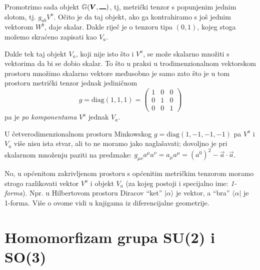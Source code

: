 Promotrimo sada objekt  $\bbtensor{G}(\vec{V},\slot)$, tj, metrički
tenzor s popunjenim jednim slotom, tj. $g_{ab}V^a$. Očito je da
taj objekt, ako ga kontrahiramo s još jednim vektorom $W^{b}$, daje skalar.
Dakle riječ je o tenzoru tipa $(0, 1)$, kojeg stoga možemo skraćeno
zapisati kao $V_a$.

Dakle tek taj objekt $V_a$, koji nije isto što i $V^a$, se može
skalarno množiti s vektorima da bi se dobio skalar. To što u praksi
u trodimenzionalnom vektorskom prostoru množimo skalarno vektore
međusobno je samo zato što je u tom prostoru metrički tenzor
jednak jediničnom 
\begin{displaymath}
g = \text{diag}(1, 1, 1) =
\begin{pmatrix}
1 & 0 & 0 \\ 0 & 1 & 0 \\ 0 & 0 & 1
\end{pmatrix}
\end{displaymath}
pa je \emph{po komponentama} $V^a$ jednak $V_a$.

U četverodimenzionalnom prostoru Minkowskog 
$g = \text{diag}(1, -1, -1, -1)$ pa $V^a$ i $V_a$ više nisu
ista stvar, ali to ne moramo jako naglašavati; dovoljno je
pri skalarnom množenju paziti na predznake:
$g_{\mu \nu} a^{\mu} a^{\nu} = a_{\mu} a^{\mu} = (a^{0})^2 
- \vec{a}\cdot\vec{a}$.

No, u općenitom zakrivljenom prostoru s općenitim metričkim
tenzorom moramo strogo razlikovati vektor $V^a$ i objekt
$V_a$ (za kojeg postoji i specijalno ime: \emph{1-forma}).
Npr. u Hilbertovom prostoru Diracov ``ket'' $|\alpha\rangle$ je
vektor, a ``bra'' $\langle\alpha|$ je 1-forma. Više o ovome
vidi u knjigama iz diferencijalne geometrije.

\chapter{Homomorfizam grupa SU(2) i SO(3)}
\label{sec:su2so3}

